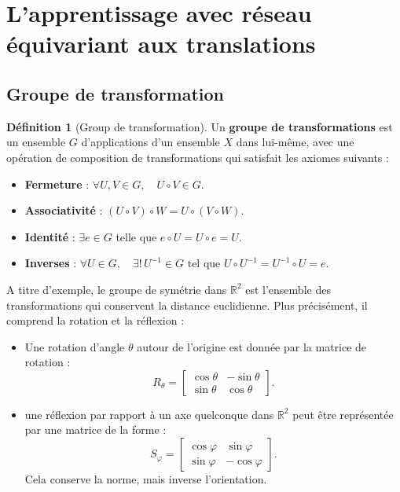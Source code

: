 \documentclass[a4paper,10pt]{article}
\theoremstyle{definition} %
\newtheorem{definition}{Définition}[section]
\theoremstyle{definition} %
\theoremstyle{definition} %
\theoremstyle{definition} %
\newcommand{\R}{\mathbb{R}}
\begin{document}
\section{L'apprentissage avec réseau équivariant aux translations}
\subsection{Groupe de transformation}


\begin{definition}[Group de transformation]
Un \textbf{groupe de transformations} est un ensemble \( G \) d'applications d'un ensemble \( X \) dans lui-même, avec une opération de composition de transformations qui satisfait les axiomes suivants :
\begin{itemize}[topsep=-5pt]
    \item \textbf{Fermeture} : \( \forall U, V \in G, \quad U \circ V \in G \).
    \item \textbf{Associativité} : \( (U \circ V) \circ W = U \circ (V \circ W) \).
    \item \textbf{Identité} : \( \exists e \in G \) telle que \( e \circ U = U \circ e = U \).
    \item \textbf{Inverses} : \( \forall U \in G, \quad \exists !\,U^{-1} \in G \text{ tel que } U \circ U^{-1} = U^{-1} \circ U = e \).
\end{itemize}
\end{definition}


 A titre d'exemple, le groupe de symétrie dans $\R^2$ est l’ensemble des transformations qui conservent la distance euclidienne. Plus précisément, il comprend la rotation et la réflexion :
\begin{itemize}
    \item Une rotation d'angle $\theta$ autour de l'origine est donnée par la matrice de rotation :
\[
R_\theta =
\begin{bmatrix}
\cos \theta & -\sin \theta \\
\sin \theta & \cos \theta
\end{bmatrix}.
\]
\item une réflexion par rapport à un axe quelconque dans \( \mathbb{R}^2 \) peut être représentée par une matrice de la forme :
\[
S_\varphi =
\begin{bmatrix}
\cos \varphi & \sin \varphi \\
\sin \varphi & -\cos \varphi
\end{bmatrix}.
\]
Cela conserve la norme, mais inverse l'orientation.
\end{itemize}
\end{document}
